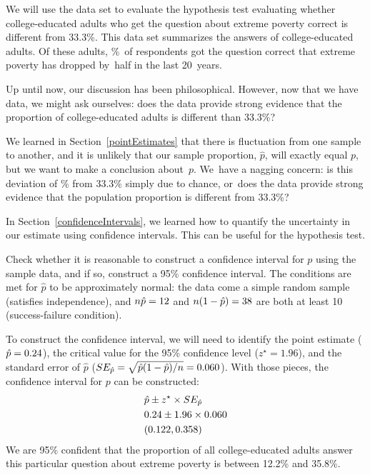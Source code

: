 We will use the  data set to evaluate
the hypothesis test evaluating whether college-educated adults
who get the question about extreme poverty correct is different
from 33.3\%.
This data set summarizes the answers of \roslingAsize{}
college-educated adults.
Of these \roslingAsize{} adults, \roslingApercent{}\%~of
respondents got the question correct that extreme poverty
has dropped by~half in the last 20~years.

Up until now, our discussion has been philosophical.
However, now that we have data, we might ask ourselves:
does the data provide strong evidence that the proportion
of college-educated adults is different than 33.3\%?

We learned in Section~\ref{pointEstimates} that there is
fluctuation from one sample to another, and it is unlikely
that our sample proportion, $\hat{p}$,
will exactly equal $p$, but we want to make
a conclusion about~$p$.
We~have a nagging concern:
is this deviation of \roslingApercent{}\%
from 33.3\% simply due to chance,
or~does the data provide strong evidence that the
population proportion is different from 33.3\%?

In Section~\ref{confidenceIntervals}, we learned how to
quantify the uncertainty in our estimate using confidence
intervals. This can be useful for the hypothesis test.

\begin{example}{Check whether it is reasonable to construct
    a confidence interval for $p$ using the sample data, and
    if so, construct a 95\% confidence interval.}
  The conditions are met for $\hat{p}$ to be approximately
  normal: the data come a simple random sample (satisfies
  independence), and $n\hat{p} = 12$ and
  $n(1 - \hat{p}) = 38$ are both
  at least 10 (success-failure condition).

  To construct the confidence interval, we will need to identify
  the point estimate ($\hat{p} = 0.24$), the critical value for
  the 95\% confidence level ($z^{\star} = 1.96$), and the standard
  error of $\hat{p}$
  ($SE_{\hat{p}} = \sqrt{\hat{p}(1 - \hat{p}) / n} = 0.060$).
  With those pieces, the confidence interval for $p$ can be
  constructed:
  \begin{align*}
    &\hat{p} \pm z^{\star} \times SE_{\hat{p}} \\
    &0.24 \pm 1.96 \times 0.060 \\
    &(0.122, 0.358)
  \end{align*}
  We are 95\% confident that the proportion of all
  college-educated adults answer this particular question
  about extreme poverty is between 12.2\%
  and 35.8\%.
\end{example}

